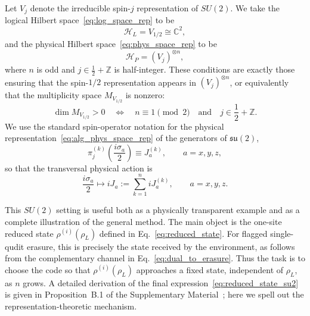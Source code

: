 \documentclass[10pt,twocolumn,superscriptaddress,aps,amsmath,amssymb,citeautoscript,floatfix,prx]{revtex4-2}
\newcounter{alg}
\theoremstyle{plain}
\theoremstyle{plain}
\theoremstyle{plain}
\theoremstyle{plain}
\theoremstyle{plain}
\theoremstyle{plain}
\begin{document}
Let $V_j$ denote the irreducible spin-$j$ representation of $SU(2)$. We take the logical Hilbert space~\eqref{eq:log_space_rep} to be
\[
    \mathcal H_L = V_{1/2}\cong \mathbb C^2,
\]
and the physical Hilbert space~\eqref{eq:phys_space_rep} to be
\[
    \mathcal H_P = (V_j)^{\otimes n},
\]
where $n$ is odd and $j\in \frac12+\mathbb Z$ is half-integer. These conditions are exactly those ensuring that the spin-$1/2$ representation appears in $(V_j)^{\otimes n}$, or equivalently that the multiplicity space $M_{V_{1/2}}$ is nonzero:
\[
    \dim M_{V_{1/2}}>0
    \quad\Longleftrightarrow\quad
    n\equiv 1 \pmod 2
    \quad\text{and}\quad
    j\in \frac12+\mathbb Z .
\]
We use the standard spin-operator notation for the physical representation~\eqref{eq:alg_phys_space_rep} of the generators of $\mathfrak{su}(2)$,
\[
    \pi_j^{(k)}\left(\frac{i\sigma_a}{2}\right)
    \equiv J_a^{(k)},
    \qquad a=x,y,z,
\]
so that the transversal physical action is
\begin{equation}\label{eq:su2_cov_rep}
    \frac{i\sigma_a}{2}
    \longmapsto
    iJ_a
    :=
    \sum_{k=1}^n iJ_a^{(k)},
    \qquad a=x,y,z .
\end{equation}

This $SU(2)$ setting is useful both as a physically transparent example and as a complete illustration of the general method. The main object is the one-site reduced state $\rho^{(i)}(\rho_L)$ defined in Eq.~\eqref{eq:reduced_state}. For flagged single-qudit erasure, this is precisely the state received by the environment, as follows from the complementary channel in Eq.~\eqref{eq:dual_to_erasure}. Thus the task is to choose the code so that $\rho^{(i)}(\rho_L)$ approaches a fixed state, independent of $\rho_L$, as $n$ grows. A detailed derivation of the final expression~\eqref{eq:reduced_state_su2} is given in Proposition~B.1 of the Supplementary Material~\cite{SuppMat}; here we spell out the representation-theoretic mechanism.

\end{document}
